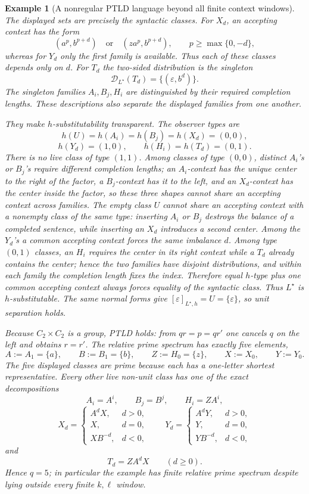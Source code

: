 \documentclass[11pt,a4paper]{article}
\newtheorem{example}[theorem]{Example}
\newcommand{\eps}{\varepsilon}
\newcommand{\D}{\mathcal D}
\begin{document}
\begin{example}[A nonregular PTLD language beyond all finite context windows]
The displayed sets are precisely the syntactic classes.  For $X_d$, an accepting context has the form
\[
(a^p,b^{p+d})\quad\text{or}\quad(za^p,b^{p+d}),
\qquad p\ge\max\{0,-d\},
\]
whereas for $Y_d$ only the first family is available.  Thus each of these classes depends only on $d$.  For $T_d$ the two-sided distribution is the singleton
\[
\D_{L^\star}(T_d)=\{(\eps,b^d)\}.
\]
The singleton families $A_i,B_j,H_i$ are distinguished by their required completion lengths.  These descriptions also separate the displayed families from one another.

They make $h$-substitutability transparent.  The observer types are
\[
h(U)=h(A_i)=h(B_j)=h(X_d)=(0,0),
\]
\[
h(Y_d)=(1,0),
\qquad
h(H_i)=h(T_d)=(0,1).
\]
There is no live class of type $(1,1)$.  Among classes of type $(0,0)$, distinct $A_i$'s or $B_j$'s require different completion lengths; an $A_i$-context has the unique center to the right of the factor, a $B_j$-context has it to the left, and an $X_d$-context has the center inside the factor, so these three shapes cannot share an accepting context across families.  The empty class $U$ cannot share an accepting context with a nonempty class of the same type: inserting $A_i$ or $B_j$ destroys the balance of a completed sentence, while inserting an $X_d$ introduces a second center.  Among the $Y_d$'s a common accepting context forces the same imbalance $d$.  Among type $(0,1)$ classes, an $H_i$ requires the center in its right context while a $T_d$ already contains the center; hence the two families have disjoint distributions, and within each family the completion length fixes the index.  Therefore equal $h$-type plus one common accepting context always forces equality of the syntactic class.  Thus $L^\star$ is $h$-substitutable.  The same normal forms give $[\eps]_{L^\star,h}=U=\{\eps\}$, so unit separation holds.

Because $C_2\times C_2$ is a group, PTLD holds: from $qr=p=qr'$ one cancels $q$ on the left and obtains $r=r'$.  The relative prime spectrum has exactly five elements,
\[
A:=A_1=\{a\},\qquad
B:=B_1=\{b\},\qquad
Z:=H_0=\{z\},\qquad
X:=X_0,\qquad
Y:=Y_0.
\]
The five displayed classes are prime because each has a one-letter shortest representative.  Every other live non-unit class has one of the exact decompositions
\[
A_i=A^i,\qquad B_j=B^j,\qquad H_i=ZA^i,
\]
\[
X_d=
\begin{cases}
A^dX,&d>0,\\
X,&d=0,\\
XB^{-d},&d<0,
\end{cases}
\qquad
Y_d=
\begin{cases}
A^dY,&d>0,\\
Y,&d=0,\\
YB^{-d},&d<0,
\end{cases}
\]
and
\[
T_d=ZA^dX\qquad(d\ge0).
\]
Hence $q=5$; in particular the example has finite relative prime spectrum despite lying outside every finite $k,\ell$ window.


\end{example}
\end{document}
